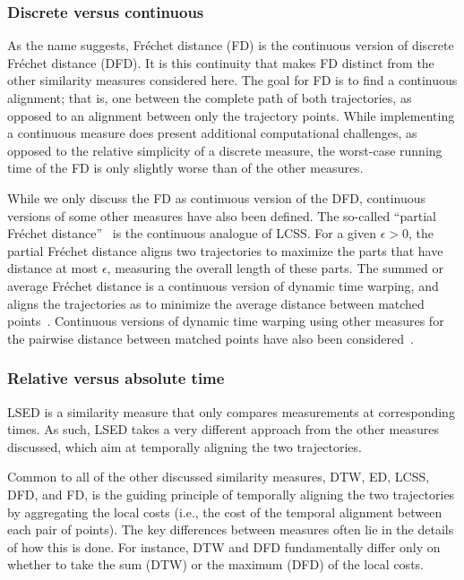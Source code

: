 \documentclass[10pt,letterpaper]{article}
\begin{document}
\subsubsection{Discrete versus continuous}

As the name suggests, Fr\'echet distance (FD) is the continuous version of discrete Fr\'echet distance (DFD). It is this continuity that makes FD distinct from the other similarity measures considered here. The goal for FD is to find a continuous alignment; that is, one between the complete path of both trajectories, as opposed to an alignment between only the trajectory points. While implementing a continuous measure does present additional computational challenges, as opposed to the relative simplicity of a discrete measure, the worst-case running time of the FD is only slightly worse than of the other measures.

While we only discuss the FD as continuous version of the DFD, continuous versions of some other measures have also been defined. The so-called ``partial Fr\'echet distance''~\cite{bbw-09} is the continuous analogue of LCSS. For a given $\epsilon >0$, the partial Fr\'echet distance aligns two trajectories to maximize the parts that have distance at most $\epsilon$, measuring the overall length of these parts. The summed or average Fr\'echet distance is a continuous version of dynamic time warping, and aligns the trajectories as to minimize the average distance between matched points~\cite{b-cfdts-07}. Continuous versions of dynamic time warping using other measures for the pairwise distance between matched points have also been considered~\cite{efrat2007curve}.

\subsubsection{Relative versus absolute time}
LSED is a similarity measure that only compares measurements at corresponding times. As such, LSED takes a very different approach from the other measures discussed, which aim at temporally aligning the two trajectories. 

Common to all of the other discussed similarity measures, DTW, ED, LCSS, DFD, and FD, is the guiding principle of temporally aligning the two trajectories by aggregating the local costs (i.e., the cost of the temporal alignment between each pair of points). The key differences between measures often lie in the details of how this is done. For instance, DTW and DFD fundamentally differ only on whether to take the sum (DTW) or the maximum (DFD) of the local costs.
\end{document}
